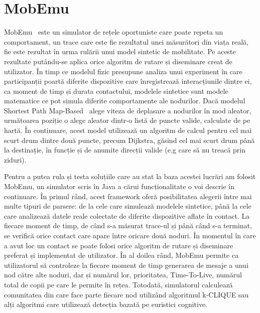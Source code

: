 \documentclass[12pt,a4paper]{report}
\begin{document}
\section{MobEmu} \label{MobEmuAnexe}
MobEmu~\cite{MobEmuArticle} este un simulator de rețele oportuniste care poate repeta un comportament, un trace care este fie rezultatul unei măsurători din viața reală, fie este rezultat în urma rulării unui model sintetic de mobilitate. Pe aceste rezultate putându-se aplica orice algoritm de rutare și diseminare creat de utilizator.
În timp ce modelul fizic presupune analiza unui experiment în care participanții poartă diferite dispozitive care înregistrează interacțiunile dintre ei, ca moment de timp și durata contactului, modelele sintetice sunt modele matematice ce pot simula diferite comportamente ale nodurilor. Dacă modelul Shortest Path Map-Based~\cite{ShortestPathMapBased} alege viteza de deplasare a nodurilor în mod aleator, următoarea poziție o alege aleator dintr-o listă de puncte valide, calculate de pe hartă. În continuare, acest model utilizează un algoritm de calcul pentru cel mai scurt drum dintre două puncte, precum Dijkstra, găsind cel mai scurt drum până la destinație, în funcție și de anumite direcții valide (e.g care să nu treacă prin ziduri). 

Pentru a putea rula și testa soluțiile care au stat la baza acestei lucrări am folosit MobEmu, un simulator scris în Java a cărui funcționalitate o voi descrie în continuare. În primul rând, acest framework oferă posibilitatea alegerii între mai multe tipuri de parsere: de la cele care simulează modelele sintetice, până la cele care analizează datele reale colectate de diferite dispozitive aflate în contact. La fiecare moment de timp, de când s-a măsurat trace-ul și până când s-a terminat, se verifică orice contact care apare între oricare două noduri. În momentul în care a avut loc un contact se poate folosi orice algoritm de rutare și diseminare preferat și implementat de utilizator. 
În al doilea rând, MobEmu permite ca utilizatorul să controleze la fiecare moment de timp generarea de mesaje a unui nod către alte noduri, dar și numărul lor, prioritatea, Time-To-Live, numărul total de copii pe care le permite în rețea. Totodată, simulatorul calculează comunitatea din care face parte fiecare nod utilizând algoritmul k-CLIQUE sau alți algoritmi care utilizează detecția bazată pe euristici cognitive. 
\end{document}
